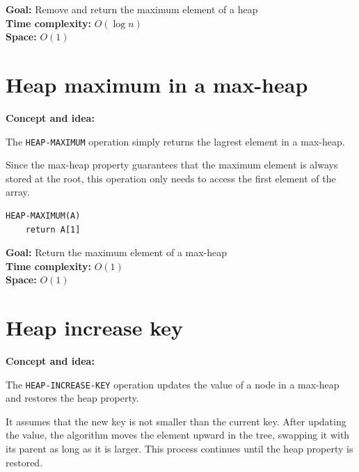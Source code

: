 \documentclass[11pt,a4paper,openany]{book}
\begin{document}
\textbf{Goal:} Remove and return the maximum element of a heap \\
\textbf{Time complexity:} $O(\log n)$ \\

\textbf{Space:} $O(1)$






\vspace{2cm}

\section{Heap maximum in a max-heap}
\textbf{Concept and idea:}

The \texttt{HEAP-MAXIMUM} operation simply returns the lagrest element in a max-heap.

Since the max-heap property guarantees that the maximum element is always stored at the root, this operation only needs to access the first element of the array.

\begin{lstlisting}
HEAP-MAXIMUM(A)
    return A[1]
\end{lstlisting}

\textbf{Goal:} Return the maximum element of a max-heap \\

\textbf{Time complexity:} $O(1)$ \\

\textbf{Space:} $O(1)$











\vspace{2cm}








\section{Heap increase key}

\textbf{Concept and idea:}

The \texttt{HEAP-INCREASE-KEY} operation updates the value of a node in a max-heap and restores the heap property.

It assumes that the new key is not smaller than the current key.  
After updating the value, the algorithm moves the element upward in the tree, swapping it with its parent as long as it is larger.  
This process continues until the heap property is restored.
\end{document}
